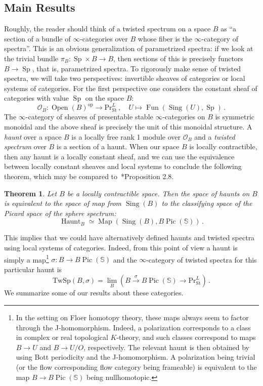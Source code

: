 \documentclass[10pt]{amsart}
\newcommand{\longto}{\longrightarrow}
\theoremstyle{plain}
\newtheorem{theorem}{Theorem}[subsection]
\theoremstyle{definition}
\DeclareMathOperator{\Sing}{Sing}
\DeclareMathOperator{\Sp}{Sp}
\DeclareMathOperator{\Fun}{Fun}
\DeclareMathOperator{\Pic}{Pic}
\DeclareMathOperator{\Haunt}{Haunt}
\DeclareMathOperator{\Map}{Map}
\DeclareMathOperator{\Open}{Open}
\newcommand{\St}{\mathrm{St}}
\newcommand{\oop}{\mathrm{op}}
\newcommand{\bS}{\mathbb{S}}
\newcommand{\cO}{\mathcal{O}}
\newcommand{\TwSp}{\mathrm{TwSp}}
\begin{document}
\subsection*{Main Results}

Roughly, the reader should think of a twisted spectrum on a space $B$ as ``a section of a bundle of $\infty$-categories over $B$ whose fiber is the $\infty$-category of spectra''.
This is an obvious generalization of parametrized spectra: if we look at the trivial bundle $\pi_B : \Sp \times B \to B$, then sections of this is precisely functors $B \to \Sp$, that is, parametrized spectra.
To rigorously make sense of twisted spectra, we will take two perspectives: invertible sheaves of categories or local systems of categories.
For the first perspective one considers the constant sheaf of categories with value $\Sp$ on the space $B$:
\[
\cO_{B} : \Open(B)^{\oop} \longto \mathrm{Pr}^{L}_{\St} \,, \quad U \mapsto \Fun(\Sing(U),\Sp) \,.
\]
The $\infty$-category of sheaves of presentable stable $\infty$-categories on $B$ is symmetric monoidal and the above sheaf is precisely the unit of this monoidal structure.
A \emph{haunt} over a space $B$ is a locally free rank 1 module over $\cO_B$ and a \emph{twisted spectrum} over $B$ is a section of a haunt.
When our space $B$ is locally contractible, then any haunt is a locally constant sheaf, and we can use the equivalence between locally constant sheaves and local systems to conclude the following theorem, which may be compared to~\cite{Dou05}*{Proposition 2.8}.

\begin{theorem}
  Let $B$ be a locally contractible space. Then the space of haunts on $B$ is equivalent to the space of map from $\Sing(B)$ to the classifying space of the Picard space of the sphere spectrum:
  \[
  \Haunt_B \simeq \Map(\Sing(B),B\Pic(\bS)) \,.
  \]
\end{theorem}

This implies that we could have alternatively defined haunts and twisted spectra using local systems of categories. Indeed, from this point of view a haunt is simply a map\footnote{In the setting on Floer homotopy theory, these maps always seem to factor through the J-homomorphism.
Indeed, a polarization corresponds to a class in complex or real topological $K$-theory, and such classes correspond to maps $B \to U$ and $B \to U/O$, respectively. The relevant haunt is then obtained by using Bott periodicity and the J-homomorphism. A polarization being trivial (or the flow corresponding flow category being frameable) is equivalent to the map $B \to B\Pic(\bS)$ being nullhomotopic.} $\sigma : B \to B\Pic(\bS)$ and the $\infty$-category of twisted spectra for this particular haunt is
    \[
    \TwSp(B,\sigma) = \lim_{B} \left( B \overset{\sigma}\longto B\Pic(\bS) \longto \mathrm{Pr}^{L}_{\St} \right) \,.
    \]
We summarize some of our results about these categories.
\end{document}

